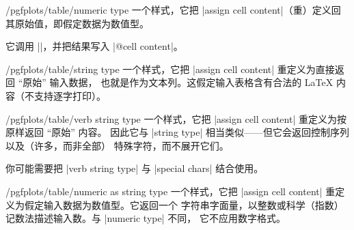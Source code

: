\documentclass[a4paper,doc2]{ltxdoc}
\begin{document}
\begin{stylekey}{/pgfplots/table/numeric type}
    一个样式，它把 |assign cell content|（重）定义回其原始值，即假定数据为数值型。

    它调用 |\pgfmathprintnumberto|，并把结果写入 |@cell content|。
\end{stylekey}

\begin{stylekey}{/pgfplots/table/string type}
    一个样式，它把 |assign cell content| 重定义为直接返回 ``原始'' 输入数据，
    也就是作为文本列。这假定输入表格含有合法的 \LaTeX{} 内容（不支持逐字打印）。
\end{stylekey}

\begin{stylekey}{/pgfplots/table/verb string type}
    一个样式，它把 |assign cell content| 重定义为按原样返回 ``原始'' 内容。
    因此它与 |string type| 相当类似——但它会返回控制序列以及（许多，而非全部）
    特殊字符，而不展开它们。

    你可能需要把 |verb string type| 与 |special chars| 结合使用。
\end{stylekey}

\begin{stylekey}{/pgfplots/table/numeric as string type}
    一个样式，它把 |assign cell content| 重定义为假定输入数据为数值型。它返回一个
    字符串字面量，以整数或科学（指数）记数法描述输入数。与 |numeric type| 不同，
    它不应用数字格式。
\end{stylekey}
\end{document}
